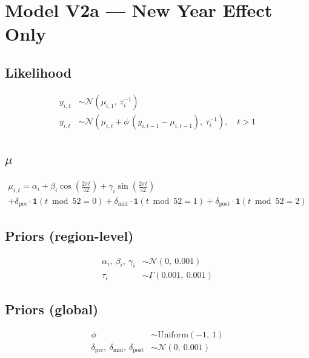 \documentclass{article}
\begin{document}
\section*{Model V2a --- New Year Effect Only}

\subsection*{Likelihood}

\begin{align}
  y_{i,1} &\sim \mathcal{N}(\mu_{i,1},\ \tau_i^{-1}) \\[6pt]
  y_{i,t} &\sim \mathcal{N}\left(\mu_{i,t} + \phi\,(y_{i,t-1} - \mu_{i,t-1}),\ \tau_i^{-1}\right), \quad t > 1
\end{align}

\subsection*{$\mu$}

\begin{multline}
  \mu_{i,t} = \alpha_i
    + \beta_i \cos\left(\tfrac{2\pi t}{52}\right)
    + \gamma_i \sin\left(\tfrac{2\pi t}{52}\right) \\
    + \delta_{\text{pre}} \cdot \mathbf{1}(t \bmod 52 = 0)
    + \delta_{\text{mid}} \cdot \mathbf{1}(t \bmod 52 = 1)
    + \delta_{\text{post}} \cdot \mathbf{1}(t \bmod 52 = 2)
\end{multline}

\subsection*{Priors (region-level)}

\begin{align}
  \alpha_i,\ \beta_i,\ \gamma_i &\sim \mathcal{N}(0,\ 0.001) \\
  \tau_i &\sim \Gamma(0.001,\ 0.001)
\end{align}

\subsection*{Priors (global)}

\begin{align}
  \phi &\sim \mathrm{Uniform}(-1,\ 1) \\
  \delta_{\text{pre}},\ \delta_{\text{mid}},\ \delta_{\text{post}} &\sim \mathcal{N}(0,\ 0.001)
\end{align}
\end{document}
